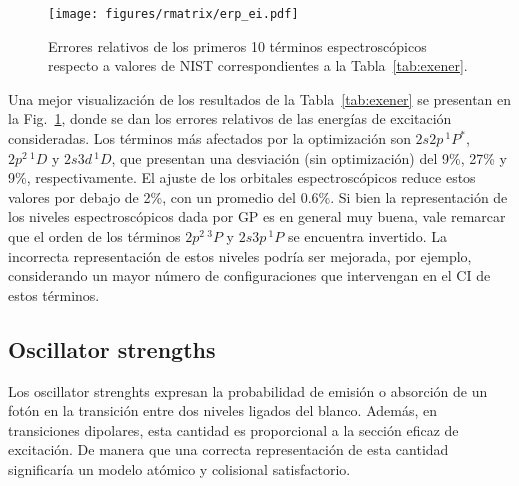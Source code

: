 \begin{figure}[t]
\centering
\texttt{[image: figures/rmatrix/erp\_ei.pdf]} 
\caption[Errores relativos de 10 términos espectroscópicos de Be.]
{Errores relativos de los primeros 10 términos espectroscópicos respecto 
a valores de NIST correspondientes a la Tabla~\ref{tab:exener}.}
\label{fig:exener}
\end{figure}

Una mejor visualización de los resultados de la 
Tabla~\ref{tab:exener} se presentan en la Fig.~\ref{fig:exener}, donde 
se dan los errores relativos de las energías de excitación consideradas. 
Los términos más afectados por la optimización son $2s2p\,^1P^*$, 
$2p^2\,^1D$ y $2s3d\,^1D$, que presentan una desviación (sin 
optimización) del 9\%, 27\% y 9\%, respectivamente. El ajuste de los 
orbitales espectroscópicos reduce estos valores por debajo de 2\%, con 
un promedio del $0.6\%$. Si bien la representación de los niveles 
espectroscópicos dada por GP es en general muy buena, vale remarcar que 
el orden de los términos $2p^2\,^3P$ y $2s3p\,^1P$ se encuentra 
invertido. La incorrecta representación de estos niveles podría ser 
mejorada, por ejemplo, considerando un mayor número de configuraciones 
que intervengan en el CI de estos términos.

\subsection{Oscillator strengths}

Los oscillator strenghts expresan la probabilidad de emisión o absorción 
de un fotón en la transición entre dos niveles ligados del blanco. 
Además, en transiciones dipolares, esta cantidad es proporcional a la 
sección eficaz de excitación. De manera que una correcta representación 
de esta cantidad significaría un modelo atómico y colisional 
satisfactorio.

